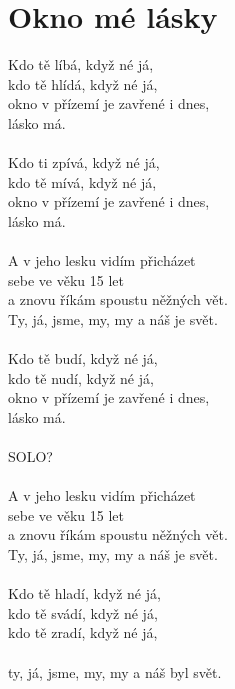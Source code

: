 \section{Okno mé lásky}
Kdo tě líbá, když né já,\\
kdo tě hlídá, když né já,\\
okno v přízemí je zavřené i dnes,\\
lásko má.\\
\\
Kdo ti zpívá, když né já,\\
kdo tě mívá, když né já, \\
okno v přízemí je zavřené i dnes,\\
lásko má.\\
\\
A v jeho lesku vidím přicházet\\
sebe ve věku 15 let\\
a znovu říkám spoustu něžných vět.\\
Ty, já, jsme, my, my a náš je svět.\\
\\
Kdo tě budí, když né já,\\
kdo tě nudí, když né já, \\
okno v přízemí je zavřené i dnes,\\
lásko má.\\
\\
SOLO?\\
\\
A v jeho lesku vidím přicházet\\
sebe ve věku 15 let\\
a znovu říkám spoustu něžných vět.\\
Ty, já, jsme, my, my a náš je svět.\\
\\
Kdo tě hladí, když né já,\\
kdo tě svádí, když né já,\\
kdo tě zradí, když né já,\\
\\
ty, já, jsme, my, my a náš byl svět.\\